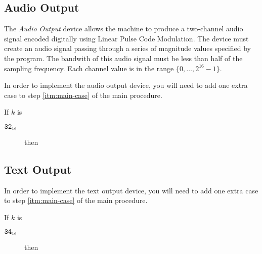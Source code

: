 \documentclass[a4paper,12pt]{article}
\newcommand{\num}[1]{\texttt{#1}}
\newcommand{\hex}[1]{\num{#1}_{\textup{\tiny 16}}}
\newcommand{\range}[2]{\{#1,\ldots,#2\}}
\newcommand{\proc}[1]{\textsc{#1}}
\newcommand{\deviceio}[1]{$\langle$#1$\rangle$}
\newcommand{\op}[1]{$#1$}
\newcommand{\ADDSAMPLE} [1]{\op{\hex{32}}}
\newcommand{\PUTCHAR}   [1]{\op{\hex{34}}}
\begin{document}
\subsection{Audio Output}

The \emph{Audio Output} device allows the machine to produce a two-channel audio signal encoded digitally using Linear Pulse Code Modulation.
The device must create an audio signal passing through a series of magnitude values specified by the program.
The bandwith of this audio signal must be less than half of the sampling frequency.
Each channel value is in the range $\range{0}{2^{16}-1}$.

In order to implement the audio output device, you will need to add one extra case to step \ref{itm:main-case} of the main procedure.

\begin{stepnumbers}[start=3]
\item If $k$ is
  \begin{description}
  \item[\ADDSAMPLE{}] then
  \end{description}
\end{stepnumbers}

\subsection{Text Output}

In order to implement the text output device, you will need to add one extra case to step \ref{itm:main-case} of the main procedure.

\begin{stepnumbers}[start=3]
  \setcounter{enumi}{2}
\item If $k$ is
  \begin{description}
  \item[\PUTCHAR{}] then
  \end{description}
\end{stepnumbers}
\end{document}
